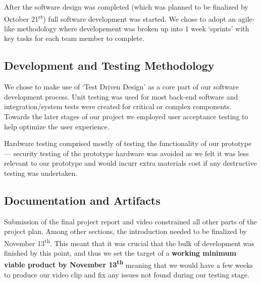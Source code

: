 \documentclass[conference]{IEEEtran}
\begin{document}
	After the software design was completed (which was planned to be finalized by October 21\textsuperscript{st}) full software development was started. We chose to adopt an agile-like methodology where developement was broken up into 1 week `sprints' with key tasks for each team member to complete.

\subsection{Development and Testing Methodology}
	We chose to make use of `Test Driven Design' as a core part of our software development process. Unit testing was used for most back-end software and integration/system tests were created for critical or complex components. Towards the later stages of our project we employed user acceptance testing to help optimize the user experience.

	Hardware testing comprised mostly of testing the functionality of our prototype --- security testing of the prototype hardware was avoided as we felt it was less relevant to our prototype and would incurr extra materials cost if any destructive testing was undertaken.

\subsection{Documentation and Artifacts}
	Submission of the final project report and video constrained all other parts of the project plan. Among other sections, the introduction needed to be finalized by November 13\textsuperscript{th}. This meant that it was crucial that the bulk of development was finished by this point, and thus we set the target of a \textbf{working minimum viable product by November 13\textsuperscript{th}} meaning that we would have a few weeks to produce our video clip and fix any issues not found during our testing stage.
\end{document}
